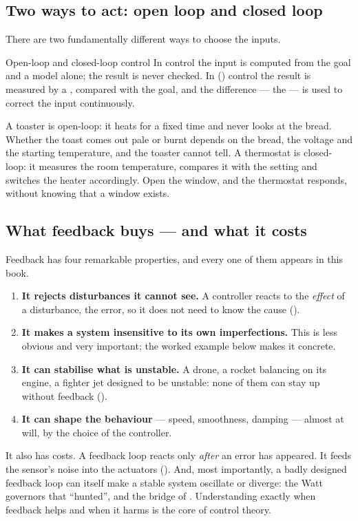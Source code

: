 \subsection{Two ways to act: open loop and closed loop}
There are two fundamentally different ways to choose the inputs.

\begin{definition}{Open-loop and closed-loop control}
In  control the input is computed from the goal and a model alone; the result is never checked. In  () control the result is measured by a , compared with the goal, and the difference — the  — is used to correct the input continuously.
\end{definition}

A toaster is open-loop: it heats for a fixed time and never looks at the bread. Whether the toast comes out pale or burnt depends on the bread, the voltage and the starting temperature, and the toaster cannot tell. A thermostat is closed-loop: it measures the room temperature, compares it with the setting and switches the heater accordingly. Open the window, and the thermostat responds, without knowing that a window exists.

\subsection{What feedback buys — and what it costs}
Feedback has four remarkable properties, and every one of them appears in this book.
\begin{enumerate}
  \item \textbf{It rejects disturbances it cannot see.} A controller reacts to the \emph{effect} of a disturbance, the error, so it does not need to know the cause ().
  \item \textbf{It makes a system insensitive to its own imperfections.} This is less obvious and very important; the worked example below makes it concrete.
  \item \textbf{It can stabilise what is unstable.} A drone, a rocket balancing on its engine, a fighter jet designed to be unstable: none of them can stay up without feedback ().
  \item \textbf{It can shape the behaviour} — speed, smoothness, damping — almost at will, by the choice of the controller.
\end{enumerate}
It also has costs. A feedback loop reacts only \emph{after} an error has appeared. It feeds the sensor's noise into the actuators (). And, most importantly, a badly designed feedback loop can itself make a stable system oscillate or diverge: the Watt governors that \enquote{hunted}, and the bridge of . Understanding exactly when feedback helps and when it harms is the core of control theory.

